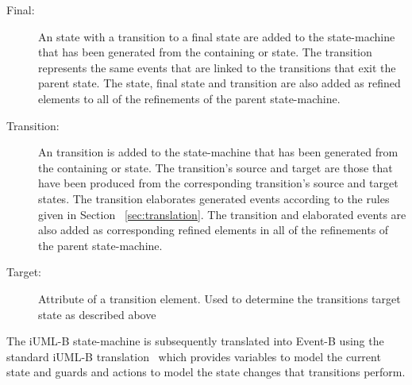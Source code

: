 \begin{description}
\item[Final:] An \iUMLB state with a transition to a final state are added to the state-machine that has been generated from the containing \SCXML or state. The transition represents the same events that are linked to the transitions that exit the parent \iUMLB state. The \iUMLB state, final state and transition are also added as refined elements to all of the refinements of the parent \iUMLB state-machine.

\item[Transition:] An \iUMLB transition is added to the state-machine that has been generated from the containing \SCXML or state. The \iUMLB transition’s source and target are those that have been produced from the corresponding \SCXML transition’s source and target states. The transition elaborates generated \EventB events according to the rules given in Section ~\ref{sec:translation}. The \iUMLB transition and elaborated \EventB events are also added as corresponding refined elements in all of the refinements of the parent \iUMLB state-machine.

\item[Target:] Attribute of a transition element. Used to determine the transitions target state as described above
\end{description}

The iUML-B state-machine is subsequently translated into Event-B using the standard iUML-B translation~\cite{snook14:_b_statem} which provides variables to model the current state and guards and actions to model the state changes that transitions perform.


